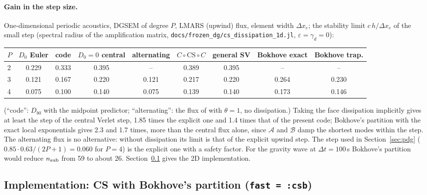 \documentclass[11pt,a4paper]{article}
\newcommand{\dt}{\Delta t}
\newcommand{\code}[1]{\texttt{#1}}
\begin{document}
\paragraph{Gain in the step size.} One-dimensional periodic acoustics, DGSEM of degree $P$, LMARS (upwind) flux, element
width $\Delta x_e$; the stability limit $c\,h/\Delta x_e$ of the small step (spectral radius of the amplification matrix,
\code{docs/frozen\_dg/cs\_dissipation\_1d.jl}, $\varepsilon=\gamma_d=0$):
\begin{center}\footnotesize\setlength{\tabcolsep}{4pt}
\begin{tabular}{lcccccccc}\toprule
$P$ & $D_0$ Euler & code & $D_0=0$ central & alternating & $C\circ\mathrm{CS}\circ C$ & general SV & Bokhove exact & Bokhove trap.\\\midrule
2 & 0.229 & 0.333 & 0.395 & -- & 0.389 & 0.395 & -- & --\\
3 & 0.121 & 0.167 & 0.220 & 0.121 & 0.217 & 0.220 & 0.264 & 0.230\\
4 & 0.075 & 0.100 & 0.140 & 0.075 & 0.139 & 0.140 & 0.173 & 0.146\\\bottomrule
\end{tabular}
\end{center}
(``code'': $D_{b0}$ with the midpoint predictor; ``alternating'': the flux of \cite{xvb} with $\theta=1$, no dissipation.)
Taking the face dissipation implicitly gives at least the step of the central Verlet step, 1.85 times the explicit one and
1.4 times that of the present code; Bokhove's partition with the exact local exponentials gives 2.3 and 1.7 times, more
than the central flux alone, since $\mathcal A$ and $\mathcal B$ damp the shortest modes within the step. The alternating flux is
no alternative: without dissipation its limit is that of the explicit upwind step. The step used in Section~\ref{sec:pdg}
($0.85\cdot0.63/(2P+1)=0.060$ for $P=4$) is the explicit one with a safety factor. For the gravity wave at $\dt=100$\,s
Bokhove's partition would reduce $n_{\rm sub}$ from 59 to about 26. Section~\ref{sec:csb} gives the 2D implementation.

\subsection{Implementation: CS with Bokhove's partition (\code{fast = :csb})}\label{sec:csb}
\end{document}
